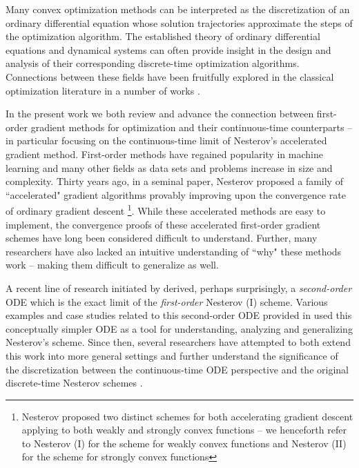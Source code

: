 Many convex optimization methods can be interpreted as the discretization of an ordinary differential equation whose solution trajectories approximate the steps of the optimization algorithm. The established theory of ordinary differential equations and dynamical systems can often provide insight in the design and analysis of their corresponding discrete-time optimization algorithms. Connections between these fields have been fruitfully explored in the classical optimization literature in a number of works \citep{helmke2012optimization, schropp2000dynamical, fiori2005quasi, durr2012class, dorr2012smooth, osher2016sparse, qin2012structured, lessard2016analysis}.

In the present work we both review and advance the connection between first-order gradient methods for optimization and their continuous-time counterparts -- in particular focusing on the continuous-time limit of Nesterov's accelerated gradient method. First-order methods have regained popularity in machine learning and many other fields as data sets and problems increase in size and complexity. Thirty years ago, in a seminal paper, Nesterov proposed a family of ``accelerated" gradient algorithms provably improving upon the convergence rate of ordinary gradient descent \citep{nesterov1983method}\footnote{Nesterov proposed two distinct schemes for both accelerating gradient descent applying to both weakly and strongly convex functions -- we henceforth refer to Nesterov (I) for the scheme for weakly convex functions and Nesterov (II) for the scheme for strongly convex functions}. While these accelerated methods are easy to implement, the convergence proofs of these accelerated first-order gradient schemes have long been considered difficult to understand. Further, many researchers have also lacked an intuitive understanding of ``why" these methods work -- making them difficult to generalize as well.

A recent line of research initiated by \citet{su2014differential} derived, perhaps surprisingly, a \textit{second-order} ODE which is the exact limit of the \textit{first-order} Nesterov (I) scheme. Various examples and case studies related to this second-order ODE provided in \citet{su2014differential} used this conceptually simpler ODE as a tool for understanding, analyzing and generalizing Nesterov’s scheme. Since then, several researchers have attempted to both extend this work into more general settings and further understand the significance of the discretization between the continuous-time ODE perspective and the original discrete-time Nesterov schemes \citep{krichene2015accelerated, wibisono2016variational, wilson2016lyapunov}.


